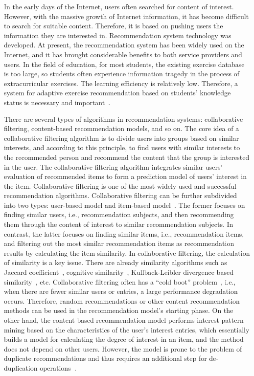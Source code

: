 In the early days of the Internet, users often searched for content of interest. However, with the massive growth of Internet information, it has become difficult to search for suitable content. Therefore, it is based on pushing users the information they are interested in. Recommendation system technology was developed. At present, the recommendation system has been widely used on the Internet, and it has brought considerable benefits to both service providers and users. In the field of education, for most students, the existing exercise database is too large, so students often experience information tragedy in the process of extracurricular exercises. The learning efficiency is relatively low. Therefore, a system for adaptive exercise recommendation based on students' knowledge status is necessary and important~\cite{huang2019exploring}.

There are several types of algorithms in recommendation systems: collaborative filtering, content-based recommendation models, and so on. The core idea of a collaborative filtering algorithm is to divide users into groups based on similar interests, and according to this principle, to find users with similar interests to the recommended person and recommend the content that the group is interested in the user. The collaborative filtering algorithm integrates similar users' evaluation of recommended items to form a prediction model of users' interest in the item. Collaborative filtering is one of the most widely used and successful recommendation algorithms. Collaborative filtering can be further subdivided into two types: user-based model and item-based model~\cite{Juan_2019}. The former focuses on finding similar users, i.e., recommendation subjects, and then recommending them through the content of interest to similar recommendation subjects. In contrast, the latter focuses on finding similar items, i.e., recommendation items, and filtering out the most similar recommendation items as recommendation results by calculating the item similarity. In collaborative filtering, the calculation of similarity is a key issue. There are already similarity algorithms such as Jaccard coefficient~\cite{leeJ2020accardcf}, cognitive similarity~\cite{cogsim2020}, Kullback-Leibler divergence based similarity~\cite{kldsim2019}, etc. Collaborative filtering often has a ``cold boot'' problem~\cite{fu2019collaborative}, i.e., when there are fewer similar users or entries, a large performance degradation occurs. Therefore, random recommendations or other content recommendation methods can be used in the recommendation model's starting phase. On the other hand, the content-based recommendation model performs interest pattern mining based on the characteristics of the user's interest entries, which essentially builds a model for calculating the degree of interest in an item, and the method does not depend on other users. However, the model is prone to the problem of duplicate recommendations and thus requires an additional step for de-duplication operations~\cite{gopalan2014content}.

